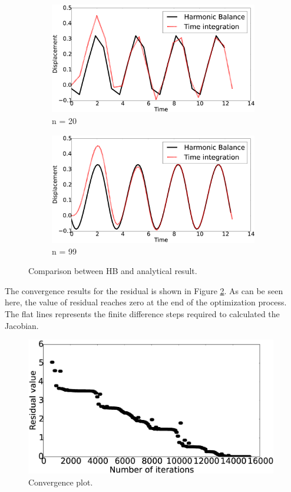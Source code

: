 \documentclass[12pt, a4paper]{extarticle}
\begin{document}
\begin{figure}[h]
	\centering
	\begin{subfigure}[h]{8.0 cm}
		\includegraphics[width=8.0 cm]{figure/3N20.eps}
		\caption{n = 20}
	\end{subfigure}
	\begin{subfigure}[h]{8.0 cm}
        \includegraphics[width=8.0 cm]{figure/3N99.eps}
		\caption{n = 99}
    \end{subfigure}
    \caption{Comparison between HB and analytical result.}
    \label{fig:R3}
\end{figure}

The convergence results for the residual is shown in Figure \ref{fig:R3_convergence}. As can be seen here, the value of residual reaches zero at the end of the optimization process. The flat lines represents the finite difference steps required to calculated the Jacobian.

\begin{figure}[h]
	\centering
	\includegraphics[height=6.00cm]{figure/convergence_study_33.eps}
	\caption{Convergence plot.}
	\label{fig:R3_convergence}
\end{figure}
\end{document}

